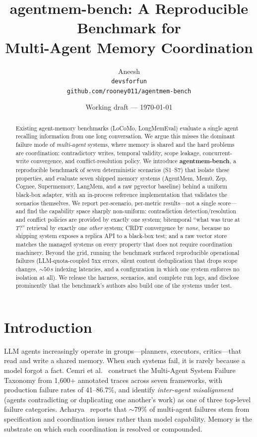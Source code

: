 \documentclass[11pt]{article}
\title{\textbf{agentmem-bench: A Reproducible Benchmark for\\ Multi-Agent Memory Coordination}}
\author{Aneesh \\ \texttt{devsforfun} \\ \texttt{github.com/rooney011/agentmem-bench}}
\date{Working draft --- \today}
\begin{document}
\maketitle

\begin{abstract}
Existing agent-memory benchmarks (LoCoMo, LongMemEval) evaluate a single agent
recalling information from one long conversation. We argue this misses the dominant
failure mode of \emph{multi-agent} systems, where memory is shared and the hard
problems are coordination: contradictory writes, temporal validity, scope leakage,
concurrent-write convergence, and conflict-resolution policy. We introduce
\textbf{agentmem-bench}, a reproducible benchmark of seven deterministic scenarios
(S1--S7) that isolate these properties, and evaluate seven shipped memory systems
(AgentMem, Mem0, Zep, Cognee, Supermemory, LangMem, and a raw pgvector baseline)
behind a uniform black-box adapter, with an in-process reference implementation that
validates the scenarios themselves. We report per-scenario, per-metric results---not
a single score---and find the capability space sharply non-uniform: contradiction
detection/resolution and conflict policies are provided by exactly one system;
bitemporal ``what was true at $T$?'' retrieval by exactly one \emph{other} system;
CRDT convergence by \emph{none}, because no shipping system exposes a replica API to
a black-box test; and a raw vector store matches the managed systems on every
property that does not require coordination machinery. Beyond the grid, running the
benchmark surfaced reproducible operational failures (LLM-quota-coupled 5xx errors,
silent content deduplication that drops scope changes, ${\sim}50$\,s indexing
latencies, and a configuration in which one system enforces no isolation at all).
We release the harness, scenarios, and complete run logs, and disclose prominently
that the benchmark's authors also build one of the systems under test.
\end{abstract}

\section{Introduction}
LLM agents increasingly operate in groups---planners, executors, critics---that read
and write a shared memory. When such systems fail, it is rarely because a model
forgot a fact. Cemri et al.~\cite{cemri2025mast} construct the Multi-Agent System
Failure Taxonomy from 1{,}600+ annotated traces across seven frameworks, with
production failure rates of 41--86.7\%, and identify \emph{inter-agent misalignment}
(agents contradicting or duplicating one another's work) as one of three top-level
failure categories. Acharya~\cite{acharya2026semconsensus} reports that ${\sim}79\%$
of multi-agent failures stem from specification and coordination issues rather than
model capability. Memory is the substrate on which such coordination is resolved or
compounded.
\end{document}

